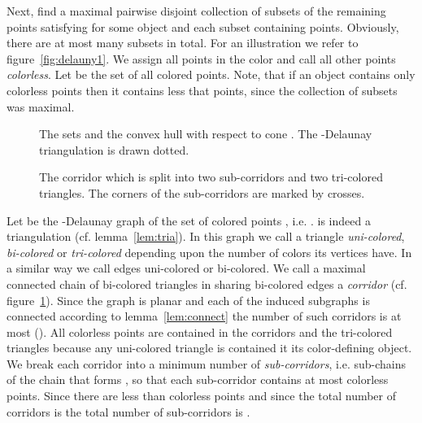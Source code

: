 \documentclass{stacs_proc}
\begin{document}
Next, find a maximal pairwise disjoint collection 
of subsets of the remaining points  satisfying
 for some object  and each subset containing 
points. Obviously, there are at most  many subsets  in
total. 
For an illustration we refer to figure~\ref{fig:delauny1}. 
We assign all points in  the color  and call all other points
\emph{colorless}. Let  be the set of all colored points. 
Note, that if an object contains only colorless points then it
contains less that  points, since the collection of subsets 
was maximal. 
\begin{figure}
\begin{minipage}{0.49\textwidth}
  \begin{center}
    \caption{The sets  and the convex hull  with
      respect to cone . The -Delaunay triangulation is drawn
      dotted.} 
    \label{fig:delauny1}
  \end{center}
\end{minipage}\hfill
\begin{minipage}{0.49\textwidth}
  \begin{center}
    \caption{The corridor  which is split into two sub-corridors
      and two tri-colored triangles. The corners of the sub-corridors
      are marked by crosses.} 
    \label{fig:delauny2}
  \end{center}
\end{minipage}
\end{figure}

Let  be the -Delaunay graph of the set of colored points
, i.e. .  is indeed a triangulation
(cf. lemma~\ref{lem:tria}). In this graph we call a triangle
\emph{uni-colored}, \emph{bi-colored} or \emph{tri-colored} depending
upon the number of colors its vertices have. In a similar way we call
edges uni-colored or bi-colored. We call a maximal connected chain of
bi-colored triangles in  sharing bi-colored edges a \emph{corridor}
(cf. figure~\ref{fig:delauny2}).  
Since the graph  is planar and each of the induced subgraphs  is connected according to lemma~\ref{lem:connect} the number of
such corridors is at most  (\cite{MSW90}). All colorless points
are contained in the corridors and the tri-colored triangles because
any uni-colored triangle is contained it its color-defining object. We
break each corridor  into a minimum number of \emph{sub-corridors},
i.e. sub-chains of the chain that forms , so that each sub-corridor
contains at most  colorless points. Since there are less than 
colorless points and since the total number of corridors is  the
total number of sub-corridors is .  
\end{document}
